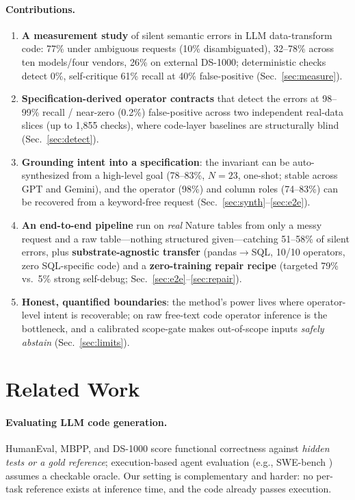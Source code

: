 \documentclass[10pt,twocolumn,letterpaper]{article}
\begin{document}
\paragraph{Contributions.}
\begin{enumerate}
\item \textbf{A measurement study} of silent semantic errors in LLM
data-transform code: 77\% under ambiguous requests (10\% disambiguated),
32--78\% across ten models/four vendors, 26\% on external DS-1000; deterministic
checks detect 0\%, self-critique 61\% recall at 40\% false-positive
(Sec.~\ref{sec:measure}).
\item \textbf{Specification-derived operator contracts} that detect the errors
at 98--99\% recall / near-zero (0.2\%) false-positive across two independent
real-data slices (up to 1{,}855 checks), where code-layer baselines are
structurally blind (Sec.~\ref{sec:detect}).
\item \textbf{Grounding intent into a specification}: the invariant can be
auto-synthesized from a high-level goal (78--83\%, $N{=}23$, one-shot; stable
across GPT and Gemini), and the operator (98\%) and column roles (74--83\%) can
be recovered from a keyword-free request (Sec.~\ref{sec:synth}--\ref{sec:e2e}).
\item \textbf{An end-to-end pipeline} run on \emph{real} Nature tables from only
a messy request and a raw table---nothing structured given---catching 51--58\%
of silent errors, plus \textbf{substrate-agnostic transfer}
(pandas${\to}$SQL, 10/10 operators, zero SQL-specific code) and a
\textbf{zero-training repair recipe} (targeted 79\% vs.\ 5\% strong self-debug;
Sec.~\ref{sec:e2e}--\ref{sec:repair}).
\item \textbf{Honest, quantified boundaries}: the method's power lives where
operator-level intent is recoverable; on raw free-text code operator inference
is the bottleneck, and a calibrated scope-gate makes out-of-scope inputs
\emph{safely abstain} (Sec.~\ref{sec:limits}).
\end{enumerate}

\section{Related Work}\label{sec:related}
\paragraph{Evaluating LLM code generation.} HumanEval, MBPP, and DS-1000
\cite{chen2021humaneval,austin2021mbpp,lai2023ds1000} score functional
correctness against \emph{hidden tests or a gold reference}; execution-based
agent evaluation (e.g., SWE-bench \cite{jimenez2024swebench}) assumes a
checkable oracle. Our setting is complementary and harder: no per-task reference
exists at inference time, and the code already passes execution.
\end{document}
